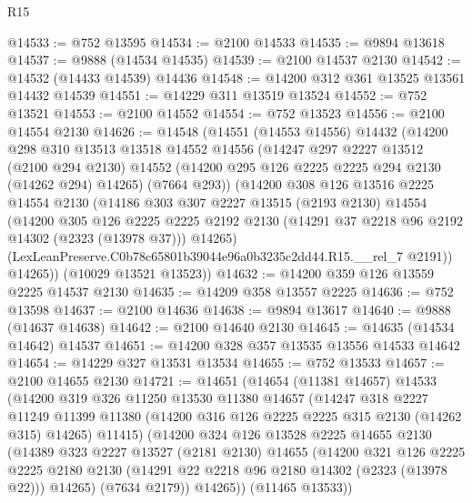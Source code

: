 \begin{lexlean}{R15}
\begin{coremodule}
@14533 := @752 @13595
@14534 := @2100 @14533
@14535 := @9894 @13618
@14537 := @9888 (@14534 @14535)
@14539 := @2100 @14537 @2130
@14542 := @14532 (@14433 @14539) @14436
@14548 := @14200 @312 @361 @13525 @13561 @14432 @14539
@14551 := @14229 @311 @13519 @13524
@14552 := @752 @13521
@14553 := @2100 @14552
@14554 := @752 @13523
@14556 := @2100 @14554 @2130
@14626 := @14548
    (@14551
      (@14553 @14556)
      @14432
      (@14200
        @298
        @310
        @13513
        @13518
        @14552
        @14556
        (@14247
          @297
          @2227
          @13512
          (@2100 @294 @2130)
          @14552
          (@14200 @295 @126 @2225 @2225 @294 @2130 (@14262 @294) @14265)
          (@7664 @293))
        (@14200
          @308
          @126
          @13516
          @2225
          @14554
          @2130
          (@14186
            @303
            @307
            @2227
            @13515
            (@2193 @2130)
            @14554
            (@14200
              @305
              @126
              @2225
              @2225
              @2192
              @2130
              (@14291 @37 @2218 @96 @2192 @14302 (@2323 (@13978 @37)))
              @14265)
            (LexLeanPreserve.C0b78c65801b39044e96a0b3235c2dd44.R15.__rel_7 @2191))
          @14265))
      (@10029 @13521 @13523))
@14632 := @14200 @359 @126 @13559 @2225 @14537 @2130
@14635 := @14209 @358 @13557 @2225
@14636 := @752 @13598
@14637 := @2100 @14636
@14638 := @9894 @13617
@14640 := @9888 (@14637 @14638)
@14642 := @2100 @14640 @2130
@14645 := @14635 (@14534 @14642) @14537
@14651 := @14200 @328 @357 @13535 @13556 @14533 @14642
@14654 := @14229 @327 @13531 @13534
@14655 := @752 @13533
@14657 := @2100 @14655 @2130
@14721 := @14651
    (@14654
      (@11381 @14657)
      @14533
      (@14200
        @319
        @326
        @11250
        @13530
        @11380
        @14657
        (@14247
          @318
          @2227
          @11249
          @11399
          @11380
          (@14200 @316 @126 @2225 @2225 @315 @2130 (@14262 @315) @14265)
          @11415)
        (@14200
          @324
          @126
          @13528
          @2225
          @14655
          @2130
          (@14389
            @323
            @2227
            @13527
            (@2181 @2130)
            @14655
            (@14200
              @321
              @126
              @2225
              @2225
              @2180
              @2130
              (@14291 @22 @2218 @96 @2180 @14302 (@2323 (@13978 @22)))
              @14265)
            (@7634 @2179))
          @14265))
      (@11465 @13533))

\end{coremodule}
\end{lexlean}
